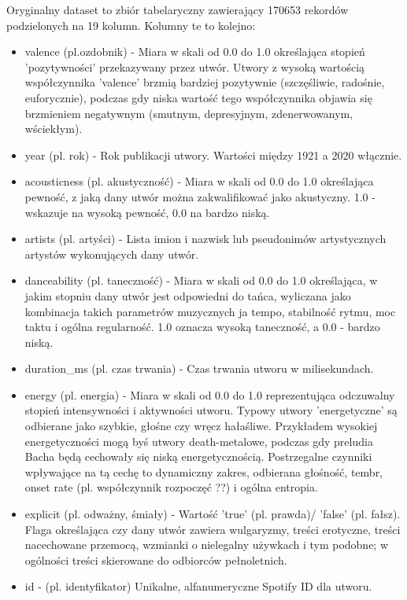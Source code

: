 \documentclass[a4paper,11pt]{article}
\begin{document}
    Oryginalny dataset to zbiór tabelaryczny zawierający 170653 rekordów podzielonych na 19 kolumn. Kolumny te to kolejno:
    \begin{itemize}
        \item valence (pl.ozdobnik) - Miara w skali od 0.0 do 1.0 określająca stopień 'pozytywności' przekazywany przez utwór. Utwory z wysoką wartością współczynnika 'valence' brzmią bardziej pozytywnie (szczęśliwie, radośnie, euforycznie), podczas gdy niska wartość tego współczynnika objawia się brzmieniem negatywnym (smutnym, depresyjnym, zdenerwowanym, wściekłym).
        \item year (pl. rok) - Rok publikacji utwory. Wartości między 1921 a 2020 włącznie.
        \item acousticness (pl. akustyczność) - Miara w skali od 0.0 do 1.0 określająca pewność, z jaką dany utwór można zakwalifikować jako akustyczny. 1.0 - wskazuje na wysoką pewność, 0.0 na bardzo niską.
        \item artists (pl. artyści) - Lista imion i nazwisk lub pseudonimów artystycznych artystów wykonujących dany utwór.
        \item danceability (pl. taneczność) - Miara w skali od 0.0 do 1.0 określająca, w jakim stopniu dany utwór jest odpowiedni do tańca, wyliczana jako kombinacja takich parametrów muzycznych ja tempo, stabilność rytmu, moc taktu i ogólna regularność. 1.0 oznacza wysoką taneczność, a 0.0 - bardzo niską.
        \item duration\_ms (pl. czas trwania) - Czas trwania utworu w milisekundach.
        \item energy (pl. energia) - Miara w skali od 0.0 do 1.0 reprezentująca odczuwalny stopień intensywności i aktywności utworu. Typowy utwory 'energetyczne' są odbierane jako szybkie, głośne czy wręcz hałaśliwe. Przykładem wysokiej energetyczności mogą byś utwory death-metalowe, podczas gdy preludia Bacha będą cechowały się niską energetycznością. Postrzegalne czynniki wpływające na tą cechę to dynamiczny zakres, odbierana głośność, tembr, onset rate (pl. współczynnik rozpoczęć ??) i ogólna entropia.
        \item explicit (pl. odważny, śmiały) - Wartość 'true' (pl. prawda)/ 'false' (pl. fałsz). Flaga określająca czy dany utwór zawiera wulgaryzmy, treści erotyczne, treści nacechowane przemocą, wzmianki o nielegalny używkach i tym podobne; w ogólności treści skierowane do odbiorców pełnoletnich.
        \item id - (pl. identyfikator) Unikalne, alfanumeryczne Spotify ID dla utworu.

\end{itemize}
\end{document}
